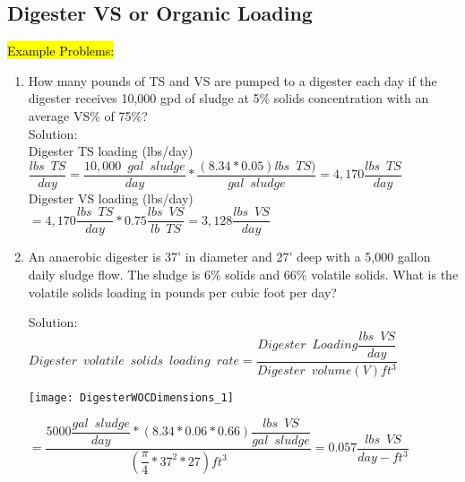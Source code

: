 \subsection{Digester VS or Organic Loading}				
				\hl{Example Problems:}\\

				\begin{enumerate}
					\item How many pounds of TS and VS are pumped to a digester each day if the digester receives 10,000 gpd of sludge at 5\% solids concentration with an average VS\% of 75\%?\\
					Solution:\\

					Digester TS loading (lbs/day)\\
					\vspace{0.3cm}
						$
							\dfrac{lbs \enspace TS}{day}
							=
							\dfrac{10,000 \enspace gal \enspace sludge}{day}
							*
							\dfrac{(8.34*0.05) lbs \enspace TS )}{gal \enspace sludge}
							=4,170
							\dfrac{lbs \enspace TS}{day}
						$
						\\
						\vspace{0.3cm}
						Digester VS loading (lbs/day)\\
						\vspace{0.3cm}
						$=4,170 	\dfrac{lbs \enspace TS}{day}*0.75\dfrac{lbs \enspace VS}{lb \enspace TS}=\boxed{3,128 \dfrac{lbs \enspace VS}{day}}$
						\vspace{0.5cm}
						\item An anaerobic digester is 37’ in diameter and 27’ deep with a 5,000 gallon daily sludge flow. The sludge is 6\% solids and 66\% volatile solids.  What is the volatile solids loading in pounds per cubic foot per day?
							
							
						Solution:\\
						{
						$
							Digester \enspace volatile \enspace solids 			\enspace loading \enspace rate = 					\dfrac
							{
							Digester \enspace Loading 
								\dfrac
								{
								lbs \enspace VS
								}
								{
								day
								}
							}
							{
							Digester \enspace volume (V)ft^3
							}
						$
						}\\
						\begin{center}
						\texttt{[image: DigesterWOCDimensions\_1]}
						\end{center}

						{
						$=\dfrac
							{
								5000
								\dfrac
									{gal \enspace sludge}
									{day}
								*(8.34*0.06*0.66) 
								\dfrac
									{lbs \enspace VS}
									{gal \enspace  sludge}
							}
							{
								(\dfrac
									{\pi}
									{4}*37^2*27)ft^3
							}
						=\boxed
							{
								0.057 \dfrac
									{lbs \enspace VS}
									{day-ft^3}
							}
						$}
				\end{enumerate}
